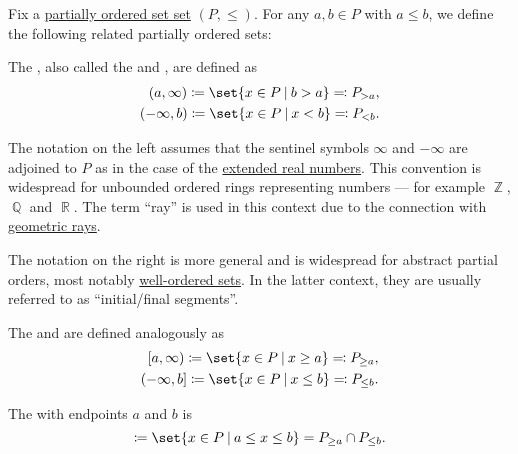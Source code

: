 \begin{definition}\label{def:partially_ordered_set_interval}
  Fix a \hyperref[def:partially_ordered_set]{partially ordered set set} \( (P, \leq) \). For any \( a, b \in P \) with \( a \leq b \), we define the following related partially ordered sets:

  \begin{thmenum}
     The , also called the  and , are defined as
    \begin{equation*}
      \begin{aligned}
        (a, \infty) \coloneqq \set{ x \in P \given b > a } \eqqcolon P_{>a},
        \\
        (-\infty, b) \coloneqq \set{ x \in P \given x < b } \eqqcolon P_{<b}.
      \end{aligned}
    \end{equation*}

    The notation on the left assumes that the sentinel symbols \( \infty \) and \( -\infty \) are adjoined to \( P \) as in the case of the \hyperref[def:extended_real_numbers]{extended real numbers}. This convention is widespread for unbounded ordered rings representing numbers --- for example \hyperref[def:set_of_integers]{\( \BbbZ \)}, \hyperref[def:set_of_rational_numbers]{\( \BbbQ \)} and \hyperref[def:set_of_real_numbers]{\( \BbbR \)}. The term \enquote{ray} is used in this context due to the connection with \hyperref[def:geometric_ray]{geometric rays}.

    The notation on the right is more general and is widespread for abstract partial orders, most notably \hyperref[def:well_ordered_set]{well-ordered sets}. In the latter context, they are usually referred to as \enquote{initial/final segments}.

    The  and  are defined analogously as
    \begin{equation*}
      \begin{aligned}
        [a, \infty) \coloneqq \set{ x \in P \given x \geq a } \eqqcolon P_{\geq a},
        \\
        (-\infty, b] \coloneqq \set{ x \in P \given x \leq b } \eqqcolon P_{\leq b}.
      \end{aligned}
    \end{equation*}

     The  with endpoints \( a \) and \( b \) is
    \begin{equation*}
      [a, b] \coloneqq \set{ x \in P \given a \leq x \leq b } = P_{\geq a} \cap P_{\leq b}.
    \end{equation*}


\end{thmenum}
\end{definition}

